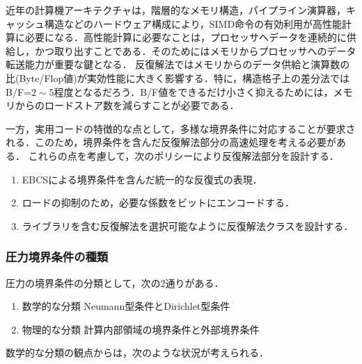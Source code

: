 近年の計算機アーキテクチャは，階層的なメモリ構造，パイプライン演算器，キャッシュ構造などのハードウェア構成により，SIMD命令の有効利用が高性能計算に必要になる．高性能計算に必要なことは，プロセッサへデータを連続的に供給し，かつ取り出すことである．そのためにはメモリからプロセッサへのデータ転送能力が重要な鍵となる．
反復解法ではメモリからのデータ供給と演算数の比(Byte/Flop値)が実効性能に大きく影響する．特に，構造格子上の差分法ではB/F=$2\sim5$程度となるだろう．B/F値をできるだけ小さく抑えるためには，メモリからのロードストア数を減らすことが必要である．

一方，実用コードの特徴的な点として，多様な境界条件に対応することが要求される．このため，境界条件を含んだ反復解法部分の高速処理を考える必要がある．
これらの点を考慮して，次のポリシーにより反復解法部分を設計する．

\begin{enumerate}
\item EBCSによる境界条件を含んだ統一的な反復式の表現．
\item ロードの抑制のため，必要な係数をビットにエンコードする．
\item ライブラリを含む反復解法を選択可能なように反復解法クラスを設計する．
\end{enumerate}

%
\subsubsection{圧力境界条件の種類}
圧力の境界条件の分類として，次の2通りがある．
\begin{enumerate}
\item 数学的な分類
Neumann型条件とDirichlet型条件
\item 物理的な分類
計算内部領域の境界条件と外部境界条件
\end{enumerate}

数学的な分類の観点からは，次のような状況が考えられる．

